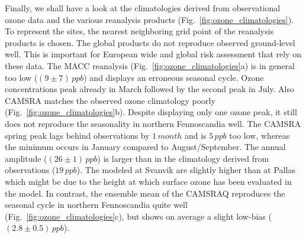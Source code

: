 \documentclass[bg, manuscript]{copernicus}
\begin{document}
Finally, we shall have a look at the climatologies derived from observational ozone data and the various reanalysis products (Fig.~\ref{fig:ozone_climatologies}). To represent the sites, the nearest neighboring grid point of the \chem{[O_3]} reanalysis products is chosen. The global products do not reproduce observed ground-level \chem{[O_3]} well. This is important for European wide and global risk assessment that rely on these data. The MACC reanalysis (Fig.~\ref{fig:ozone_climatologies}a) is in general too low ($(9\pm 7)\,\unit{ppb}$) and displays an erroneous seasonal cycle. Ozone concentrations peak already in March followed by the second peak in July. Also CAMSRA matches the observed ozone climatology poorly (Fig.~\ref{fig:ozone_climatologies}b). Despite displaying only one ozone peak, it still does not reproduce the seasonality in northern Fennoscandia well. The CAMSRA spring peak lags behind observations by $1\,\unit{month}$ and is $5\,\unit{ppb}$ too low, whereas the minimum occurs in January compared to August/September. The annual amplitude ($(26\pm 1)\,\unit{ppb}$) is larger than in the climatology derived from observations ($19\,\unit{ppb}$). The modeled \chem{[O_3]} at Svanvik are slightly higher than at Pallas which might be due to the height at which surface ozone has been evaluated in the model. In contrast, the ensemble mean of the CAMSRAQ reproduces the seasonal cycle in northern Fennoscandia quite well (Fig.~\ref{fig:ozone_climatologies}c), but shows on average a slight low-bias ($(2.8\pm 0.5)\,\unit{ppb}$).
\end{document}
